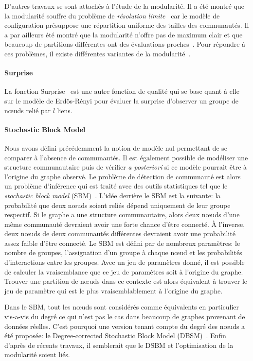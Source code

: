 D'autres travaux se sont attachés à l'étude de la modularité.
Il a été montré que la modularité souffre du problème de \emph{résolution limite}~\cite{Fortunato2007,Lancichinetti2011} car le modèle de configuration présuppose une répartition uniforme des tailles des communautés.
Il a par ailleurs été montré que la modularité n'offre pas de maximum clair et que beaucoup de partitions différentes ont des évaluations proches~\cite{Good2010}.
Pour répondre à ces problèmes, il existe différentes variantes de la modularité~\cite{Reichardt2006,Delvenne2010}.

\paragraph{Surprise}
La fonction Surprise~\cite{Aldecoa2011,Traag2015b} est une autre fonction de qualité qui se base quant à elle sur le modèle de Erdös-Rényi pour évaluer la surprise d'observer un groupe de n\oe uds relié par $l$ liens.

\paragraph{Stochastic Block Model}
Nous avons défini précédemment la notion de modèle nul permettant de se comparer à l'absence de communautés.
Il est également possible de modéliser une structure communautaire puis de vérifier \emph{a posteriori} si ce modèle pourrait être à l'origine du graphe observé.
Le problème de détection de communauté est alors un problème d'inférence qui est traité avec des outils statistiques tel que le \emph{stochastic block model} (SBM)~\cite{Holland1983a,Nowicki2001}.
L'idée derrière le SBM est la suivante: la probabilité que deux n\oe uds soient reliés dépend uniquement de leur groupe respectif.
Si le graphe a une structure communautaire, alors deux n\oe uds d'une même communauté devraient avoir une forte chance d'être connecté.
\`A l'inverse, deux n\oe uds de deux communautés différentes devraient avoir une probabilité assez faible d'être connecté.
Le SBM est défini par de nombreux paramètres: le nombre de groupes, l'assignation d'un groupe à chaque n\oe ud et les probabilités d'interactions entre les groupes.
Avec un jeu de paramètres donné, il est possible de calculer la vraisemblance que ce jeu de paramètres soit à l'origine du graphe.
Trouver une partition de n\oe uds dans ce contexte est alors équivalent à trouver le jeu de paramètre qui est le plus vraisemblablement à l'origine du graphe.

Dans le SBM, tout les n\oe uds sont considérés comme équivalents en particulier vis-a-vis du degré ce qui n'est pas le cas dans beaucoup de graphes provenant de données réelles.
C'est pourquoi une version tenant compte du degré des n\oe uds a été proposée: le Degree-corrected Stochastic Block Model (DBSM)~\cite{Karrer2011}.
Enfin d'après de récents travaux\cite{Newman2016}, il semblerait que le DSBM et l'optimisation de la modularité soient liés.

